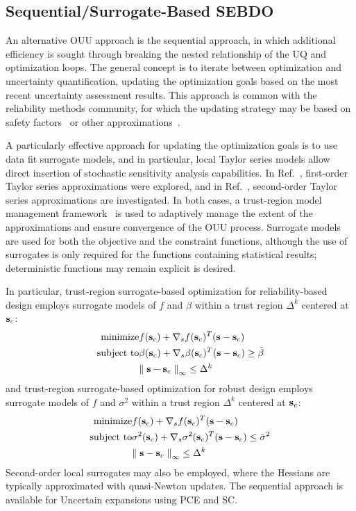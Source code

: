 \subsection{Sequential/Surrogate-Based SEBDO} \label{ouu:sebdo:surr}

An alternative OUU approach is the sequential approach, in which
additional efficiency is sought through breaking the nested
relationship of the UQ and optimization loops.  The general concept is
to iterate between optimization and uncertainty quantification,
updating the optimization goals based on the most recent uncertainty
assessment results.  This approach is common with the reliability
methods community, for which the updating strategy may be based on
safety factors~\cite{Wu01} or other approximations~\cite{Du04}.

A particularly effective approach for updating the optimization goals
is to use data fit surrogate models, and in particular, local Taylor
series models allow direct insertion of stochastic sensitivity
analysis capabilities.  In Ref.~\cite{Eld05}, first-order Taylor
series approximations were explored, and in Ref.~\cite{Eld06a},
second-order Taylor series approximations are investigated.  In both
cases, a trust-region model management framework~\cite{Eld06b} is
used to adaptively manage the extent of the approximations and ensure
convergence of the OUU process.  Surrogate models are used for both
the objective and the constraint functions, although the use of
surrogates is only required for the functions containing statistical
results; deterministic functions may remain explicit is desired.

In particular, trust-region surrogate-based optimization for
reliability-based design employs surrogate models of $f$ and $\beta$
within a trust region $\Delta^k$ centered at ${\bf s}_c$:
\begin{eqnarray}
  {\rm minimize }     & f({\bf s}_c) + \nabla_s f({\bf s}_c)^T
({\bf s} - {\bf s}_c) \nonumber \\
  {\rm subject \ to } & \beta({\bf s}_c) + \nabla_s \beta({\bf s}_c)^T
({\bf s} - {\bf s}_c) \ge \bar{\beta} \\
& {\parallel {\bf s} - {\bf s}_c \parallel}_\infty \le \Delta^k \nonumber
\label{eq:rbdo_surr}
\end{eqnarray}
and trust-region surrogate-based optimization for robust design
employs surrogate models of $f$ and $\sigma^2$ within a trust region
$\Delta^k$ centered at ${\bf s}_c$:
\begin{eqnarray}
  {\rm minimize }     & f({\bf s}_c) + \nabla_s f({\bf s}_c)^T
({\bf s} - {\bf s}_c) \nonumber \\
  {\rm subject \ to } & \sigma^2({\bf s}_c) + \nabla_s \sigma^2({\bf s}_c)^T 
({\bf s} - {\bf s}_c) \le \bar{\sigma}^2 \\
& {\parallel {\bf s} - {\bf s}_c \parallel}_\infty \le \Delta^k \nonumber
\label{eq:rdo_surr}
\end{eqnarray}
Second-order local surrogates may also be employed, where the Hessians
are typically approximated with quasi-Newton updates.  The sequential
approach is available for Uncertain expansions using PCE and SC.

